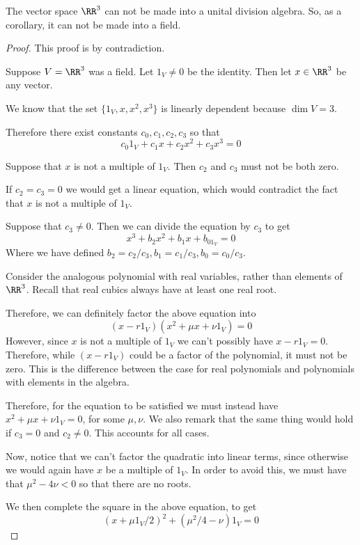 \begin{thm}
    The vector space $\RR^3$ can not be made into a unital division algebra. So, as a corollary, it can not be made into a field.
\end{thm}
\begin{proof}
    This proof is by contradiction. 
    
    Suppose $V=\RR^3$ was a field. Let $1_V\neq 0$ be the identity. Then let $x\in \RR^3$ be any vector. 
    
    We know that the set $\{1_V,x,x^2,x^3\}$ is linearly dependent because $\dim V = 3$. 
    
    Therefore there exist constants $c_0,c_1,c_2,c_3$ so that 
    \[c_0 1_V + c_1 x + c_2 x^2 + c_3 x^3 = 0\] 
    
    Suppose that $x$ is not a multiple of $1_V$. Then $c_2$ and $c_3$ must not be both zero.

    If $c_2 = c_3 = 0$ we would get a linear equation, which would contradict the fact that $x$ is not a multiple of $1_V$.

    Suppose that $c_3 \neq 0$. Then we can divide the equation by $c_3$ to get 
    \[x^3 + b_2 x^2 + b_1 x + b_01_V =0\]
    Where we have defined $b_2 = c_2/c_3, b_1 = c_1/c_3, b_0=c_0/c_3$.

    Consider the analogous polynomial with real variables, rather than elements of $\RR^3$. Recall that real cubics always have at least one real root.
    
    Therefore, we can definitely factor the above equation into
    \[(x-r 1_V)(x^2+\mu x + \nu1_V) = 0\]
    However, since $x$ is not a multiple of $1_V$ we can't possibly have $x-r1_V = 0$. Therefore, while $(x-r 1_V)$ could be a factor of the polynomial, it must not be zero. This is the difference between the case for real polynomials and polynomials with elements in the algebra.
    
    Therefore, for the equation to be satisfied we must instead have $x^2+\mu x + \nu 1_V= 0$, for some $\mu,\nu$. We also remark that the same thing would hold if $c_3 = 0$ and $c_2\neq 0$. This accounts for all cases.    
    
    Now, notice that we can't factor the quadratic into linear terms, since otherwise we would again have $x$ be a multiple of $1_V$. In order to avoid this, we must have that $\mu^2 - 4\nu < 0$ so that there are no roots. 
    
    We then complete the square in the above equation, to get 
    \[(x+\mu 1_V/2)^2 + (\mu^2/4 - \nu)1_V =0 \]
    

\end{proof}
